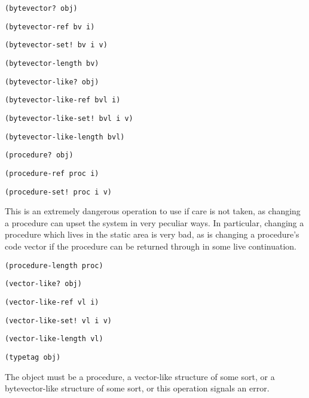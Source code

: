 \begin{description}

\item {\verb+(bytevector? obj)+}

\item {\verb+(bytevector-ref bv i)+}

\item {\verb+(bytevector-set! bv i v)+}

\item {\verb+(bytevector-length bv)+}

\item {\verb+(bytevector-like? obj)+}

\item {\verb+(bytevector-like-ref bvl i)+}

\item {\verb+(bytevector-like-set! bvl i v)+}

\item {\verb+(bytevector-like-length bvl)+}

\item {\verb+(procedure? obj)+}

\item {\verb+(procedure-ref proc i)+}

\item {\verb+(procedure-set! proc i v)+}

This is an extremely dangerous operation to use if care is not taken, as
changing a procedure can upset the system in very peculiar ways. In particular,
changing a procedure which lives in the static area is very bad, as is changing
a procedure's code vector if the procedure can be returned through in some
live continuation.

\item {\verb+(procedure-length proc)+}

\item {\verb+(vector-like? obj)+}

\item {\verb+(vector-like-ref vl i)+}

\item {\verb+(vector-like-set! vl i v)+}

\item {\verb+(vector-like-length vl)+}

\item {\verb+(typetag obj)+}

The object must be a procedure, a vector-like structure of some sort, or a
bytevector-like structure of some sort, or this operation signals an error.


\end{description}
